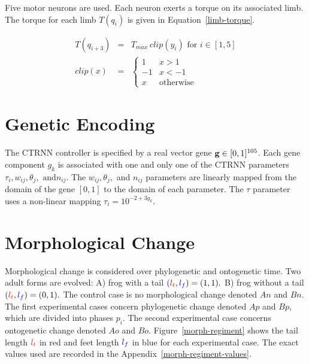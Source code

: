 Five motor neurons are used.  Each neuron exerts a torque on its
associated limb.  The torque for each limb $T(q_i)$ is given in
Equation~\ref{limb-torque}.

\begin{eqnarray}
  T(q_{i + 3}) &=& T_{max}~clip(y_i) \text{ for } i \in [1,5] \label{limb-torque} \\
  clip(x) &=& \begin{cases}
              1 & x > 1 \\
              -1 & x < -1 \\
              x & \text{otherwise} 
              \end{cases}
\end{eqnarray}

\section{Genetic Encoding}

The CTRNN controller is specified by a real vector gene $\mathbf{g} \in [0,
  1]^{105}$.  Each gene component $g_k$ is associated with one and
only one of the CTRNN parameters $\tau_i, w_{ij}, \theta_j, \text{ and
} n_{ij}$.  The $w_{ij}, \theta_j,$ and $ n_{ij}$ parameters are
linearly mapped from the domain of the gene $[0,1]$ to the domain of
each parameter.  The $\tau$ parameter uses a non-linear mapping
$\tau_i = 10^{-2 + 3 g_k}$.

\section{Morphological Change}\label{morph-change}

Morphological change is considered over phylogenetic and ontogenetic
time.  Two adult forms are evolved: A) frog with a tail $(\color{red}l_t\color{black},
\color{blue}l_f\color{black}) = (1,1).$ B) frog without a tail $(\color{red}l_t\color{black}, \color{blue}l_f\color{black}) =
(0,1).$ The control case is no morphological change denoted $An$ and
$Bn$.  The first experimental cases concern phylogenetic change
denoted $Ap$ and $Bp$, which are divided into phases $p_i$.  The
second experimental case concerns ontogenetic change denoted $Ao$ and
$Bo$.  Figure~\ref{morph-regiment} shows the tail length $\color{red}l_t\color{black}$ in
red and feet length $\color{blue}l_f\color{black}$ in blue for each experimental case.
The exact values used are recorded in the
Appendix~\ref{morph-regiment-values}.

